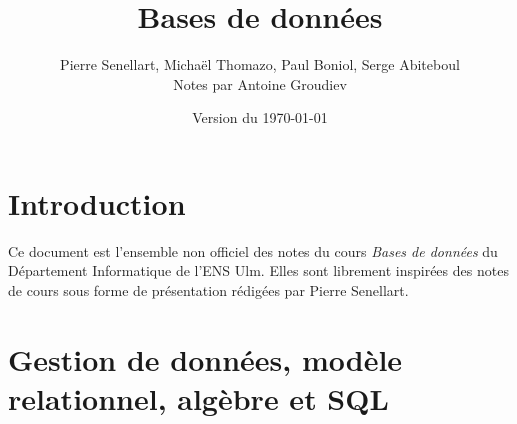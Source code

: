 \documentclass[french, toc]{../cs-classes/cs-classes}
\title{Bases de données}
\author{Pierre Senellart, Michaël Thomazo, Paul Boniol, Serge Abiteboul\\ Notes par Antoine Groudiev}
\date{Version du \today}
\begin{document}
\section*{Introduction}
Ce document est l'ensemble non officiel des notes du cours \emph{Bases de données} du Département Informatique de l'ENS Ulm. Elles sont librement inspirées des notes de cours sous forme de présentation rédigées par Pierre Senellart.

\section{Gestion de données, modèle relationnel, algèbre et SQL}
\end{document}
